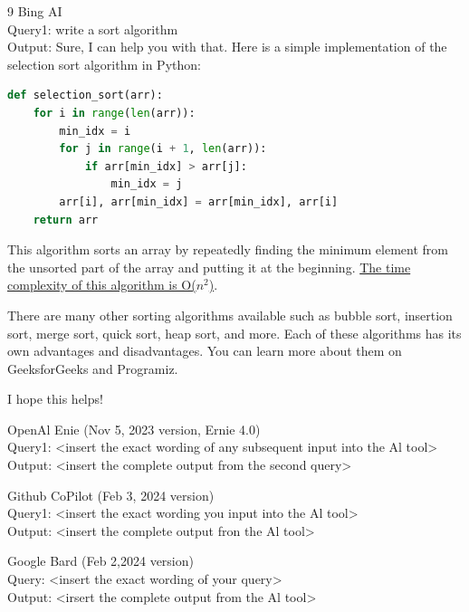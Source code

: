 \documentclass{mcmthesis}
\begin{document}
\begin{ReportAiUse}{9}
    Bing AI\\
    Query1: write a sort algorithm\\
    Output: Sure, I can help you with that. Here is a simple implementation of the selection sort algorithm in Python:
    \begin{lstlisting}[language=python]
def selection_sort(arr):
    for i in range(len(arr)):
        min_idx = i
        for j in range(i + 1, len(arr)):
            if arr[min_idx] > arr[j]:
                min_idx = j
        arr[i], arr[min_idx] = arr[min_idx], arr[i]
    return arr
\end{lstlisting}
    This algorithm sorts an array by repeatedly finding the minimum element from the unsorted part of the array and putting it at the beginning. \href{https://www.geeksforgeeks.org/sorting-algorithms/}{The time complexity of this algorithm is O($n^2$)}.

    There are many other sorting algorithms available such as bubble sort, insertion sort, merge sort, quick sort, heap sort, and more. Each of these algorithms has its own advantages and disadvantages. You can learn more about them on GeeksforGeeks and Programiz.

    I hope this helps!

    OpenAl Enie (Nov 5, 2023 version, Ernie 4.0)\\
    Query1: <insert the exact wording of any subsequent input into the Al tool>\\
    Output: <insert the complete output from the second query>

    Github CoPilot (Feb 3, 2024 version)\\
    Query1: <insert the exact wording you input into the Al tool>\\
    Output: <insert the complete output fron the Al tool>

    Google Bard (Feb 2,2024 version)\\
    Query: <insert the exact wording of your query>\\
    Output: <irsert the complete output from the Al tool>

\end{ReportAiUse}
\end{document}
